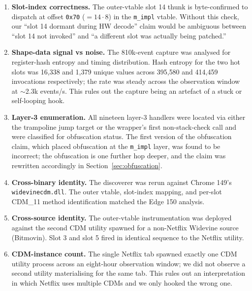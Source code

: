 \documentclass[11pt,letterpaper]{article}
\begin{document}
\begin{enumerate}[itemsep=2pt,topsep=2pt]
  \item \textbf{Slot-index correctness.}  The outer-vtable slot 14
        thunk is byte-confirmed to dispatch at offset \texttt{0x70}
        ($= 14 \cdot 8$) in the \texttt{m\_impl} vtable.  Without
        this check, our ``slot 14 dormant during HW decode'' claim
        would be ambiguous between ``slot 14 not invoked'' and ``a
        different slot was actually being patched.''
  \item \textbf{Shape-data signal vs noise.}  The 810k-event capture
        was analysed for register-hash entropy and timing
        distribution.  Hash entropy for the two hot slots was 16{,}338
        and 1{,}379 unique values across 395{,}580 and 414{,}459
        invocations respectively; the rate was steady across the
        observation window at $\sim$2.3k events/s.  This rules out
        the capture being an artefact of a stuck or self-looping
        hook.
  \item \textbf{Layer-3 enumeration.}  All nineteen layer-3 handlers
        were located via either the trampoline jump target or the
        wrapper's first non-stack-check call and were classified for
        obfuscation status.  The first version of the obfuscation
        claim, which placed obfuscation at the \texttt{m\_impl}
        layer, was found to be incorrect; the obfuscation is one
        further hop deeper, and the claim was rewritten accordingly
        in Section~\ref{sec:obfuscation}.
  \item \textbf{Cross-binary identity.}  The discoverer was rerun
        against Chrome 149's \texttt{widevinecdm.dll}.  The outer
        vtable, slot-index mapping, and per-slot CDM\_11 method
        identification matched the Edge 150 analysis.
  \item \textbf{Cross-source identity.}  The outer-vtable
        instrumentation was deployed against the second CDM utility
        spawned for a non-Netflix Widevine source (Bitmovin).  Slot 3
        and slot 5 fired in identical sequence to the Netflix
        utility.
  \item \textbf{CDM-instance count.}  The single Netflix tab spawned
        exactly one CDM utility process across an eight-hour
        observation window; we did not observe a second utility
        materialising for the same tab.  This rules out an
        interpretation in which Netflix uses multiple CDMs and we
        only hooked the wrong one.
\end{enumerate}
\end{document}
